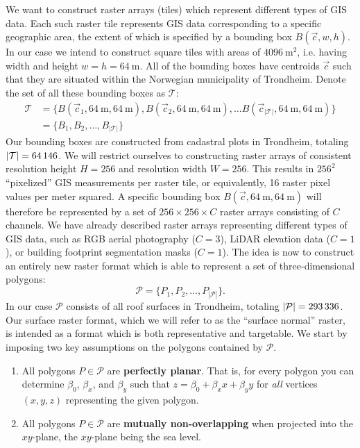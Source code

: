 We want to construct raster arrays (tiles) which represent different types of GIS data.
Each such raster tile represents GIS data corresponding to a specific geographic area, the extent of which is specified by a bounding box $B(\vec{c}, w, h)$.
In our case we intend to construct square tiles with areas of $\SI{4096}{\meter\squared}$, i.e. having width and height $w = h = \SI{64}{\meter}$.
All of the bounding boxes have centroids $\vec{c}$ such that they are situated within the Norwegian municipality of Trondheim.
Denote the set of all these bounding boxes as $\mathcal{T}$:
%
\begin{align*}
  \mathcal{T}
  &=
  \{
    B(\vec{c}_1, \SI{64}{\meter}, \SI{64}{\meter}),
    B(\vec{c}_2, \SI{64}{\meter}, \SI{64}{\meter}),
    \dots
    B(\vec{c}_{|\mathcal{T}|}, \SI{64}{\meter}, \SI{64}{\meter})
  \}
  \\
  &=
  \{
    B_1,
    B_2,
    \dots,
    B_{|\mathcal{T}|}
  \}
\end{align*}
%
Our bounding boxes are constructed from cadastral plots in Trondheim, totaling $|\mathcal{T}| = \num{64146}$.
We will restrict ourselves to constructing raster arrays of consistent resolution height $H = 256$ and resolution width $W = 256$.
This results in $256^2$ \enquote{pixelized} GIS measurements per raster tile, or equivalently, \num{16} raster pixel values per meter squared.
A specific bounding box $B(\vec{c}, \SI{64}{\meter}, \SI{64}{\meter})$ will therefore be represented by a set of $256 \times 256 \times C$ raster arrays consisting of $C$ channels.
We have already described raster arrays representing different types of GIS data, such as RGB aerial photography ($C = 3$), LiDAR elevation data ($C = 1$), or building footprint segmentation masks ($C = 1$).
The idea is now to construct an entirely new raster format which is able to represent a set of three-dimensional polygons:
\begin{equation*}
  \mathcal{P}
  =
  \{
    P_1,
    P_2,
    \dots,
    P_{|\mathcal{P}|}
  \}.
\end{equation*}
In our case $\mathcal{P}$ consists of all roof surfaces in Trondheim, totaling $|\mathcal{P}| = \num{293336}$.
Our surface raster format, which we will refer to as the \enquote{surface normal} raster, is intended as a format which is both representative and targetable.
We start by imposing two key assumptions on the polygons contained by $\mathcal{P}$.
\begin{enumerate}
  \item\label{itm:flat} All polygons $P \in \mathcal{P}$ are \textbf{perfectly planar}.
    That is, for every polygon you can determine $\beta_0$, $\beta_x$, and $\beta_y$ such that $z = \beta_0 + \beta_x x + \beta_y y$ for \emph{all} vertices $(x, y, z)$ representing the given polygon.
  \item\label{itm:non-overlapping} All polygons $P \in \mathcal{P}$ are \textbf{mutually non-overlapping} when projected into the $xy$-plane, the $xy$-plane being the sea level.
\end{enumerate}
